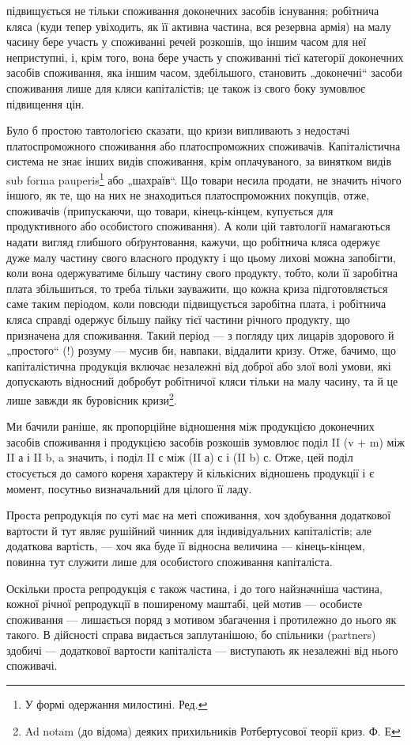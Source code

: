 підвищується не тільки споживання доконечних засобів існування; робітнича
кляса (куди тепер увіходить, як її активна частина, вся резервна
армія) на малу часину бере участь у споживанні речей розкошів, що іншим
часом для неї неприступні, і, крім того, вона бере участь у споживанні
тієї категорії доконечних засобів споживання, яка іншим часом, здебільшого,
становить „доконечні“ засоби споживання лише для кляси капіталістів;
це також із свого боку зумовлює підвищення цін.

Було б простою тавтологією сказати, що кризи випливають з недостачі
платоспроможного споживання або платоспроможних споживачів.
Капіталістична система не знає інших видів споживання, крім оплачуваного,
за винятком видів sub forma pauperis\footnote*{
У формі одержання милостині. Ред.
} або „шахраїв“. Що
товари несила продати, не значить нічого іншого, як те, що на них не
знаходиться платоспроможних покупців, отже, споживачів (припускаючи,
що товари, кінець-кінцем, купується для продуктивного або особистого
споживання). А коли цій тавтології намагаються надати вигляд
глибшого обґрунтовання, кажучи, що робітнича кляса одержує дуже малу
частину свого власного продукту і що цьому лихові можна запобігти,
коли вона одержуватиме більшу частину свого продукту, тобто, коли її
заробітна плата збільшиться, то треба тільки зауважити, що кожна криза
підготовляється саме таким періодом, коли повсюди підвищується заробітна
плата, і робітнича кляса справді одержує більшу пайку тієї частини
річного продукту, що призначена для споживання. Такий період — з погляду
цих лицарів здорового й „простого“ (!) розуму — мусив би, навпаки,
віддалити кризу. Отже, бачимо, що капіталістична продукція включає
незалежні від доброї або злої волі умови, які допускають відносний
добробут робітничої кляси тільки на малу часину, та й це лише завжди
як буровісник кризи\footnote{
Ad notam (до відома) деяких прихильників Ротбертусової теорії криз. Ф. Е
}.

Ми бачили раніше, як пропорційне відношення між продукцією
доконечних засобів споживання і продукцією засобів розкошів зумовлює
поділ II (v + m) між II а і II b, a значить, і поділ II с між (II а) с і (II b) с.
Отже, цей поділ стосується до самого кореня характеру й кількісних відношень
продукції і є момент, посутньо визначальний для цілого її ладу.

Проста репродукція по суті має на меті споживання, хоч здобування
додаткової вартости й тут являє рушійний чинник для індивідуальних
капіталістів; але додаткова вартість, — хоч яка буде її відносна величина —
кінець-кінцем, повинна тут служити лише для особистого споживання
капіталіста.

Оскільки проста репродукція є також частина, і до того найзначніша
частина, кожної річної репродукції в поширеному маштабі, цей мотив —
особисте споживання — лишається поряд з мотивом збагачення і протилежно
до нього як такого. В дійсності справа видається заплутанішою,
бо спільники (partners) здобичі — додаткової вартости капіталіста — виступають
як незалежні від нього споживачі.